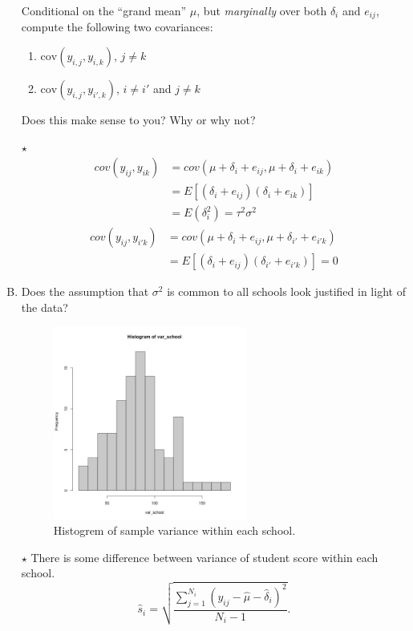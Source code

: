 \documentclass[11pt]{article}
\newcommand{\jie}{$\star$ }
\begin{document}
\begin{enumerate}[(A)]
Conditional on the ``grand mean'' $\mu$, but \emph{marginally} over both $\delta_i$ and $e_{ij}$, compute the following two covariances:

\begin{enumerate}
\item $\mbox{cov}(y_{i,j}, y_{i,k})$, $j \neq k$
\item $\mbox{cov}(y_{i,j}, y_{i', k})$, $i \neq i'$ and $j \neq k$
\end{enumerate}

Does this make sense to you?  Why or why not?  

\bigskip
\jie
\begin{align*}
    cov(y_{ij}, y_{ik}) &= cov(\mu + \delta_i + e_{ij}, \mu + \delta_i + e_{ik}) \\
    &= E[(\delta_i + e_{ij})(\delta_i + e_{ik})] \\
    &= E(\delta_i^2) = \tau^2 \sigma^2
\end{align*}
\begin{align*}
    cov(y_{ij}, y_{i'k}) &= cov(\mu + \delta_i + e_{ij}, \mu + \delta_{i'} + e_{i'k}) \\
    &=E[(\delta_i + e_{ij})(\delta_{i'} + e_{i'k})] = 0
\end{align*}

\item Does the assumption that $\sigma^2$ is common to all schools look justified in light of the data?  
\bigskip
\begin{figure}[h]
    \centering
    \includegraphics[width=0.6\textwidth]{Ex4/figures/var_school.jpeg}
    \caption{Histogrem of sample variance within each school.}
    \label{fig:bary_n}
\end{figure}
\jie There is some difference between variance of student score within each school.
$$\hat{s}_i = \sqrt{\frac{\sum_{j=1}^{N_i} (y_{ij} - \hat{\mu} - \hat{\delta}_i)^2}{N_i - 1}}.$$


\end{enumerate}
\end{document}
